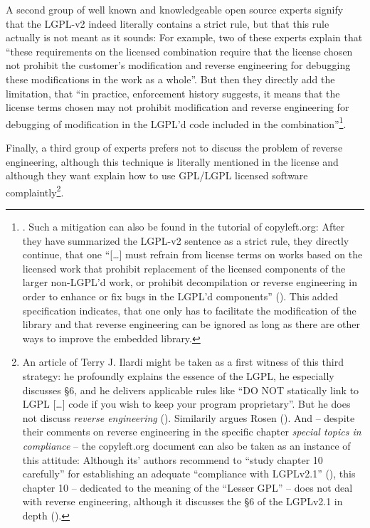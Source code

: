 A second group of well known and knowledgeable open source experts signify that
the LGPL-v2 indeed literally contains a strict rule, but that this rule actually
is not meant as it sounds: For example, two of these experts explain that
\enquote{these requirements on the licensed combination require that the license
chosen not prohibit the customer’s modification and reverse engineering for
debugging these modifications in the work as a whole}. But then they directly
add the limitation, that \enquote{in practice, enforcement history suggests, it
means that the license terms chosen may not prohibit modification and reverse
engineering for debugging of modification in the LGPL’d code included in the
combination}\footnote{\cite[cf.][\nopage wp., chapter LGPLv2.1, section
6]{MogCho2014a}. Such a mitigation can also be found in the tutorial of
copyleft.org: After they have summarized the LGPL-v2 sentence as a strict rule,
they directly continue, that one \enquote{[\ldots] must refrain from license
terms on works based on the licensed work that prohibit replacement of the
licensed components of the larger non-LGPL'd work, or prohibit decompilation or
reverse engineering in order to enhance or fix bugs in the LGPL'd components}
(\cite[cf.][86]{KuhSebGin2014a}). This added specification indicates, that one
only has to facilitate the modification of the library and that reverse
engineering can be ignored as long as there are other ways to improve the
embedded library.}.

Finally, a third group of experts prefers not to discuss the problem of reverse
engineering, although this technique is literally mentioned in the license and
although they want explain how to use GPL/LGPL licensed software
complaintly\footnote{An article of Terry J. Ilardi might be taken as a first
witness of this third strategy: he profoundly explains the essence of the LGPL,
he especially discusses §6, and he delivers applicable rules like \enquote{DO
NOT statically link to LGPL [\ldots] code if you wish to keep your program
proprietary}. But he does not discuss \emph{reverse engineering}
(\cite[cf.][5f]{Ilardi2010a}). Similarily argues Rosen
(\cite[cf.][121ff]{Rosen2005a}). And -- despite their comments on reverse
engineering in the specific chapter \emph{special topics in compliance} -- the
copyleft.org document can also be taken as an instance of this attitude:
Although its' authors recommend to \enquote{study chapter 10 carefully} for
establishing an adequate \enquote{compliance with LGPLv2.1}
(\cite[cf.][86]{KuhSebGin2014a}), this chapter 10 -- dedicated to the meaning of
the \enquote{Lesser GPL} -- does not deal with reverse engineering, although it
discusses the §6 of the LGPLv2.1 in depth (\cite[cf.][56ff, esp.
60f]{KuhSebGin2014a}).}.

